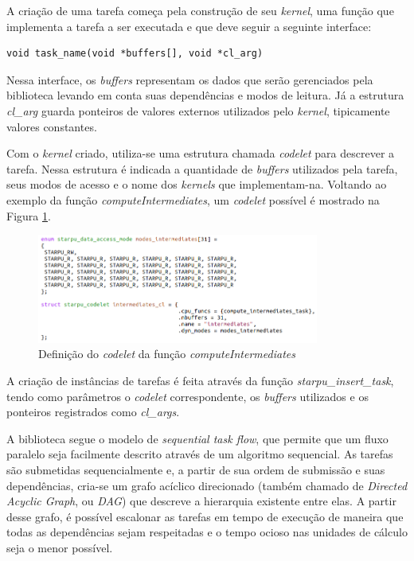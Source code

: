 \documentclass[cic,tc]{iiufrgs}
\begin{document}
A criação de uma tarefa começa pela construção de seu \textit{kernel}, uma função que implementa a tarefa a ser executada e que deve seguir a seguinte interface:

\begin{verbatim}
void task_name(void *buffers[], void *cl_arg)
\end{verbatim}

Nessa interface, os \textit{buffers} representam os dados que serão gerenciados pela biblioteca levando em conta suas dependências e modos de leitura. Já a estrutura
\textit{cl\_arg} guarda ponteiros de valores externos utilizados pelo \textit{kernel}, tipicamente valores constantes.

Com o \textit{kernel} criado, utiliza-se uma estrutura chamada \textit{codelet} para descrever a tarefa. Nessa estrutura é indicada a quantidade de \textit{buffers} utilizados
pela tarefa, seus modos de acesso e o nome dos \textit{kernels} que implementam-na. Voltando ao exemplo da função \textit{computeIntermediates}, um \textit{codelet}
possível é mostrado na Figura \ref{fig:intermediates_cl}.

\begin{figure}[!htb]
    \caption{Definição do \textit{codelet} da função \textit{computeIntermediates}}
    \begin{center}
      \includegraphics[width=25em]{intermediates_cl}
    \end{center}
    \label{fig:intermediates_cl}
\end{figure}

A criação de instâncias de tarefas é feita através da função \textit{starpu\_insert\_task}, tendo como parâmetros o \textit{codelet} correspondente, os \textit{buffers} utilizados e
os ponteiros registrados como \textit{cl\_args}. 

A biblioteca segue o modelo de \textit{sequential task flow}, que permite que um fluxo paralelo seja facilmente descrito através de um algoritmo sequencial. As tarefas são submetidas
sequencialmente e, a partir de sua ordem de submissão e suas dependências, cria-se um grafo acíclico direcionado (também chamado de \textit{Directed Acyclic Graph}, ou \textit{DAG})
que descreve a hierarquia existente entre elas. A partir desse grafo, é possível escalonar as tarefas em tempo de execução de maneira que todas as dependências sejam respeitadas e o
tempo ocioso nas unidades de cálculo seja o menor possível.
\end{document}
